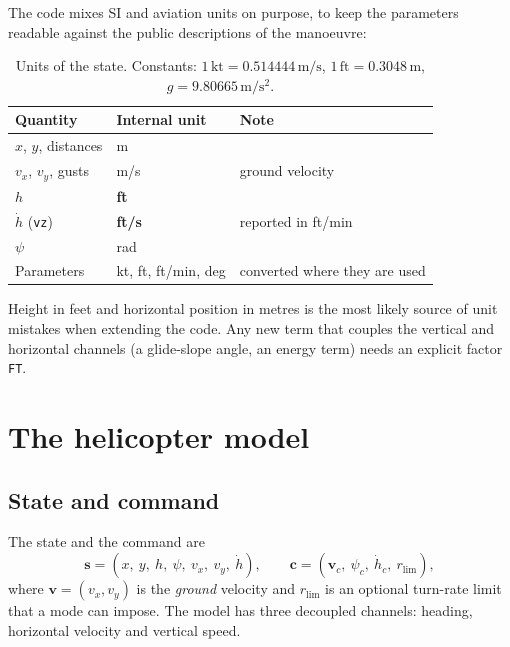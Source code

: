 \documentclass[11pt,a4paper]{article}
\newcommand{\code}[1]{\texttt{#1}}
\newcommand{\un}[1]{\,\mathrm{#1}}
\begin{document}
The code mixes SI and aviation units on purpose, to keep the parameters
readable against the public descriptions of the manoeuvre:

\begin{table}[H]
\centering\small
\begin{tabular}{@{}lll@{}}
\toprule
Quantity & Internal unit & Note \\
\midrule
$x$, $y$, distances & m & \\
$v_x$, $v_y$, gusts & m/s & ground velocity \\
$h$ & \textbf{ft} & \\
$\dot h$ (\code{vz}) & \textbf{ft/s} & reported in ft/min \\
$\psi$ & rad & \\
Parameters & kt, ft, ft/min, deg & converted where they are used \\
\bottomrule
\end{tabular}
\caption{Units of the state. Constants: $1\un{kt}=0.514444\un{m/s}$,
$1\un{ft}=0.3048\un{m}$, $g=9.80665\un{m/s^2}$.}
\end{table}

\begin{devnote}
Height in feet and horizontal position in metres is the most likely source of
unit mistakes when extending the code. Any new term that couples the vertical
and horizontal channels (a glide-slope angle, an energy term) needs an explicit
factor \code{FT}.
\end{devnote}

\section{The helicopter model}\label{sec:model}

\subsection{State and command}

The state and the command are
\begin{equation}
\mathbf{s} = (x,\ y,\ h,\ \psi,\ v_x,\ v_y,\ \dot h), \qquad
\mathbf{c} = (\mathbf{v}_c,\ \psi_c,\ \dot h_c,\ r_{\lim}),
\end{equation}
where $\mathbf{v}=(v_x,v_y)$ is the \emph{ground} velocity and $r_{\lim}$ is
an optional turn-rate limit that a mode can impose. The model has three
decoupled channels: heading, horizontal velocity and vertical speed.
\end{document}
